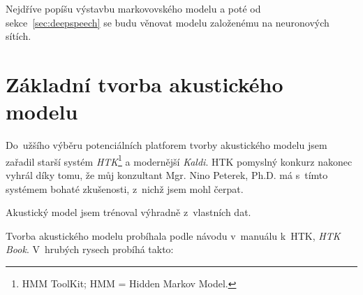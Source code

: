 Nejdříve popíšu výstavbu markovovského modelu a poté od
sekce~\ref{sec:deepspeech} se budu věnovat modelu založenému na neuronových
sítích.

\section{Základní tvorba akustického modelu}

Do~užšího výběru potenciálních platforem tvorby akustického modelu jsem zařadil
starší systém \textit{HTK}\footnote{HMM ToolKit; HMM = Hidden Markov Model.}\cite{young2002htk} a
modernější \textit{Kaldi}\cite{povey2011kaldi}. HTK pomyslný konkurz nakonec
vyhrál díky tomu, že můj konzultant Mgr. Nino Peterek, Ph.D. má s~tímto systémem
bohaté zkušenosti, z~nichž jsem mohl čerpat.

Akustický model jsem trénoval výhradně z~vlastních dat.

Tvorba akustického modelu probíhala podle návodu v~manuálu k~HTK, \textit{HTK
Book}. V~hrubých rysech probíhá takto:

